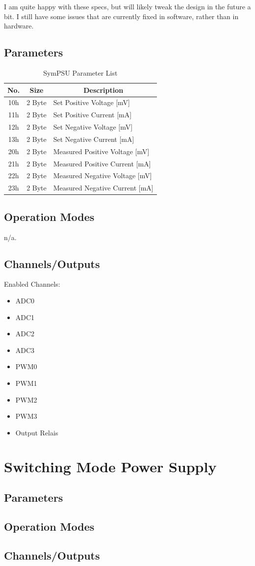 I am quite happy with these specs, but will likely tweak the design in the future a bit. I still have some issues that are currently fixed in software, rather than in hardware. 

\subsection{Parameters}
\begin{table}[H]
    \centering
    \begin{tabular}{|c|c|l|}
        \hline
        \textbf{No.}   &   \textbf{Size} & \multicolumn{1}{|c|}{\textbf{Description}}\\ \hline \hline
        10h   &  2 Byte &  Set Positive Voltage [mV]\\ \hline
		11h   &  2 Byte &  Set Positive Current [mA]\\ \hline
		12h   &  2 Byte &  Set Negative Voltage [mV]\\ \hline
		13h   &  2 Byte &  Set Negative Current [mA]\\ \hline
		20h   &  2 Byte &  Measured Positive Voltage [mV]\\ \hline
		21h   &  2 Byte &  Measured Positive Current [mA]\\ \hline
		22h   &  2 Byte &  Measured Negative Voltage [mV]\\ \hline
		23h   &  2 Byte &  Measured Negative Current [mA]\\ \hline
    \end{tabular}
	\caption{SymPSU Parameter List}
\label{tab:Par-SymPSU}
\end{table}
\subsection{Operation Modes}
n/a.
\subsection{Channels/Outputs}
Enabled Channels:
\begin{itemize}
	\item ADC0
	\item ADC1
	\item ADC2
	\item ADC3
	\item PWM0
	\item PWM1
	\item PWM2
	\item PWM3
	\item Output Relais
\end{itemize}

\section{Switching Mode Power Supply}


\subsection{Parameters}
\subsection{Operation Modes}
\subsection{Channels/Outputs}